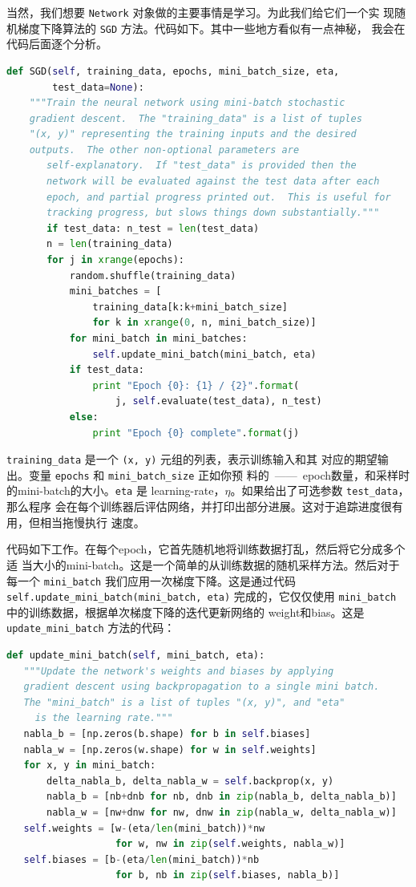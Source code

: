 当然，我们想要 \lstinline!Network! 对象做的主要事情是学习。为此我们给它们一个实
现随机梯度下降算法的 \lstinline!SGD! 方法。代码如下。其中一些地方看似有一点神秘，
我会在代码后面逐个分析。
\begin{lstlisting}[language=Python]
def SGD(self, training_data, epochs, mini_batch_size, eta,
        test_data=None):
    """Train the neural network using mini-batch stochastic
    gradient descent.  The "training_data" is a list of tuples
    "(x, y)" representing the training inputs and the desired
    outputs.  The other non-optional parameters are
       self-explanatory.  If "test_data" is provided then the
       network will be evaluated against the test data after each
       epoch, and partial progress printed out.  This is useful for
       tracking progress, but slows things down substantially."""
       if test_data: n_test = len(test_data)
       n = len(training_data)
       for j in xrange(epochs):
           random.shuffle(training_data)
           mini_batches = [
               training_data[k:k+mini_batch_size]
               for k in xrange(0, n, mini_batch_size)]
           for mini_batch in mini_batches:
               self.update_mini_batch(mini_batch, eta)
           if test_data:
               print "Epoch {0}: {1} / {2}".format(
                   j, self.evaluate(test_data), n_test)
           else:
               print "Epoch {0} complete".format(j)
\end{lstlisting}

\lstinline!training_data! 是一个 \lstinline!(x, y)! 元组的列表，表示训练输入和其
对应的期望输出。变量 \lstinline!epochs! 和 \lstinline!mini_batch_size! 正如你预
料的~——~\gls*{epoch}数量，和采样时的\gls*{mini-batch}{}的大小。\lstinline!eta! 是%
\gls*{learning-rate}，$\eta$。如果给出了可选参数 \lstinline!test_data!，那么程序
会在每个训练器后评估网络，并打印出部分进展。这对于追踪进度很有用，但相当拖慢执行
速度。

代码如下工作。在每个\gls*{epoch}，它首先随机地将训练数据打乱，然后将它分成多个适
当大小的\gls*{mini-batch}{}。这是一个简单的从训练数据的随机采样方法。然后对于每一个
\lstinline!mini_batch! 我们应用一次梯度下降。这是通过代码
\lstinline!self.update_mini_batch(mini_batch, eta)! 完成的，它仅仅使用
\lstinline!mini_batch! 中的训练数据，根据单次梯度下降的迭代更新网络的%
\gls*{weight}和\gls*{bias}。这是 \lstinline!update_mini_batch! 方法的代码：
\begin{lstlisting}[language=Python]
def update_mini_batch(self, mini_batch, eta):
   """Update the network's weights and biases by applying
   gradient descent using backpropagation to a single mini batch.
   The "mini_batch" is a list of tuples "(x, y)", and "eta"
     is the learning rate."""
   nabla_b = [np.zeros(b.shape) for b in self.biases]
   nabla_w = [np.zeros(w.shape) for w in self.weights]
   for x, y in mini_batch:
       delta_nabla_b, delta_nabla_w = self.backprop(x, y)
       nabla_b = [nb+dnb for nb, dnb in zip(nabla_b, delta_nabla_b)]
       nabla_w = [nw+dnw for nw, dnw in zip(nabla_w, delta_nabla_w)]
   self.weights = [w-(eta/len(mini_batch))*nw
                   for w, nw in zip(self.weights, nabla_w)]
   self.biases = [b-(eta/len(mini_batch))*nb
                   for b, nb in zip(self.biases, nabla_b)]
\end{lstlisting}

